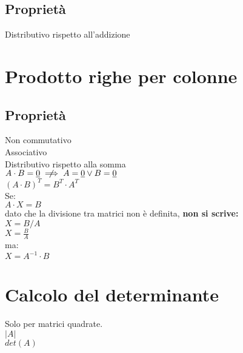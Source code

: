 \documentclass[a4paper, twoside, italian, 11pt]{book}
\newcommand{\detm}[1] {\left | #1 \right |}
\begin{document}
\subsection{Proprietà}

Distributivo rispetto all'addizione



\section{Prodotto righe per colonne}



\subsection{Proprietà}

Non commutativo \\
Associativo \\
Distributivo rispetto alla somma \\

\noindent
$A \cdot B = \underline{0} \centernot\implies A = \underline{0} \lor B = \underline{0}$ \\

\noindent
$(A \cdot B)^T = B^T \cdot A^T$ \\

\noindent
Se: \\

$A \cdot X = B$ \\

\noindent
dato che la divisione tra matrici non è definita, \textbf{non si scrive:} \\

$X = B / A$ \\
\indent
$X = \frac{B}{A}$ \\

\noindent
ma: \\

$X = A^{-1} \cdot B$



\section{Calcolo del determinante}

Solo per matrici quadrate. \\

\noindent
$\detm A$ \\

\noindent
$det(A)$
\end{document}
